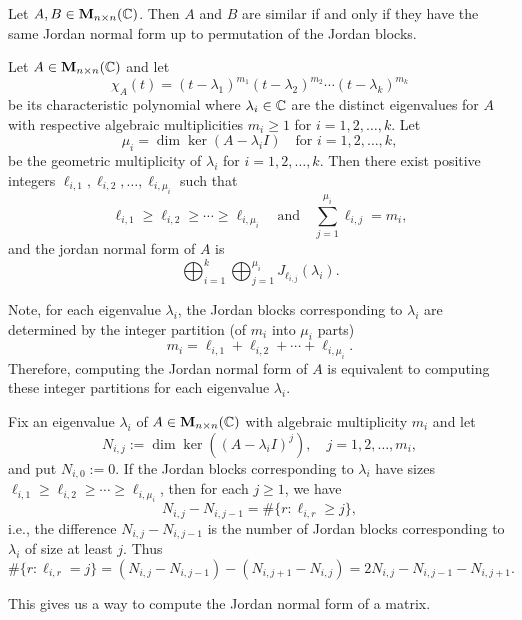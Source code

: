 \begin{theoremenv}
    Let $A,B\in \mathbf{M}_{n\times n}(\mathbb{C})$. Then $A$ and $B$ are similar if and only if they have the same Jordan normal form up to permutation of the Jordan blocks.
\end{theoremenv}
\begin{propositionenv}
    Let $A\in \mathbf{M}_{n\times n}(\mathbb{C})$ and let
    $$ \chi_A(t) = (t-\lambda_1)^{m_1} (t-\lambda_2)^{m_2} \cdots (t-\lambda_k)^{m_k} $$
    be its characteristic polynomial where $\lambda_i \in \mathbb{C}$ are the distinct eigenvalues for $A$ with respective algebraic multiplicities $m_i \ge 1$ for $i=1,2,\ldots,k$. Let
    $$ \mu_i = \dim \ker (A - \lambda_i I) \quad \text{for } i=1,2,\ldots,k, $$
    be the geometric multiplicity of $\lambda_i$ for $i=1,2,\ldots,k$. Then there exist positive integers $\ell_{i,1}, \ell_{i,2}, \ldots, \ell_{i,\mu_i}$ such that
    $$ \ell_{i,1} \ge \ell_{i,2} \ge \cdots \ge \ell_{i,\mu_i} \quad \text{and} \quad \sum_{j=1}^{\mu_i} \ell_{i,j} = m_i, $$
    and the jordan normal form of $A$ is
    $$
    \bigoplus_{i=1}^k \bigoplus_{j=1}^{\mu_i} J_{\ell_{i,j}}(\lambda_i).
    $$
\end{propositionenv}
\begin{remarkenv}
    Note, for each eigenvalue $\lambda_i$, the Jordan blocks corresponding to $\lambda_i$ are determined by the integer partition (of $m_i$ into $\mu_i$ parts)
    $$ m_i = \ell_{i,1} + \ell_{i,2} + \cdots + \ell_{i,\mu_i}. $$
    Therefore, computing the Jordan normal form of $A$ is equivalent to computing these integer partitions for each eigenvalue $\lambda_i$.
\end{remarkenv}
\begin{theoremenv}
    Fix an eigenvalue $\lambda_i$ of $A\in \mathbf{M}_{n\times n}(\mathbb{C})$ with algebraic multiplicity $m_i$ and let
    $$ N_{i,j}  := \dim \ker \left( (A-\lambda_i I) ^j \right), \quad j=1,2,\ldots,m_i, $$
    and put $N_{i,0} := 0$. If the Jordan blocks corresponding to $\lambda_i$ have sizes $\ell_{i,1} \ge \ell_{i,2} \ge \cdots \ge \ell_{i,\mu_i}$, then for each $j\ge 1$, we have
    $$ N_{i,j} - N_{i,j-1} = \# \{ r : \ell_{i,r} \ge j \}, $$
    i.e., the difference $N_{i,j} - N_{i,j-1}$ is the number of Jordan blocks corresponding to $\lambda_i$ of size at least $j$. Thus
    $$ \# \{ r : \ell_{i,r} = j \} = (N_{i,j} - N_{i,j-1}) - (N_{i,j+1} - N_{i,j}) = 2 N_{i,j} - N_{i,j-1} - N_{i,j+1}. $$
\end{theoremenv}
\begin{remarkenv}
    This gives us a way to compute the Jordan normal form of a matrix.
\end{remarkenv}

